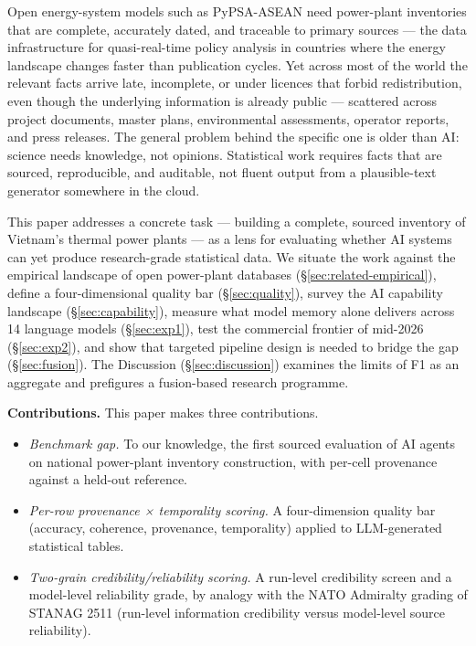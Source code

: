 \documentclass[a4paper,11pt]{article}
\providecommand{\tightlist}{%
  \setlength{\itemsep}{0pt}\setlength{\parskip}{0pt}}
\begin{document}
Open energy-system models such as PyPSA-ASEAN need power-plant
inventories that are complete, accurately dated, and traceable to
primary sources --- the data infrastructure for quasi-real-time policy
analysis in countries where the energy landscape changes faster than
publication cycles. Yet across most of the world the relevant facts
arrive late, incomplete, or under licences that forbid redistribution,
even though the underlying information is already public --- scattered
across project documents, master plans, environmental assessments,
operator reports, and press releases. The general problem behind the
specific one is older than AI: science needs knowledge, not opinions.
Statistical work requires facts that are sourced, reproducible, and
auditable, not fluent output from a plausible-text generator somewhere
in the cloud.

This paper addresses a concrete task --- building a complete, sourced
inventory of Vietnam's thermal power plants --- as a lens for evaluating
whether AI systems can yet produce research-grade statistical data. We
situate the work against the empirical landscape of open power-plant
databases (§\ref{sec:related-empirical}), define a four-dimensional
quality bar (§\ref{sec:quality}), survey the AI capability landscape
(§\ref{sec:capability}), measure what model memory alone delivers across
14 language models (§\ref{sec:exp1}), test the commercial frontier of
mid-2026 (§\ref{sec:exp2}), and show that targeted pipeline design is
needed to bridge the gap (§\ref{sec:fusion}). The Discussion
(§\ref{sec:discussion}) examines the limits of F1 as an aggregate and
prefigures a fusion-based research programme.

\textbf{Contributions.} This paper makes three contributions.

\begin{itemize}
\tightlist
\item
  \emph{Benchmark gap.} To our knowledge, the first sourced evaluation
  of AI agents on national power-plant inventory construction, with
  per-cell provenance against a held-out reference.
\item
  \emph{Per-row provenance × temporality scoring.} A four-dimension
  quality bar (accuracy, coherence, provenance, temporality) applied to
  LLM-generated statistical tables.
\item
  \emph{Two-grain credibility/reliability scoring.} A run-level
  credibility screen and a model-level reliability grade, by analogy
  with the NATO Admiralty grading of STANAG 2511 (run-level information
  credibility versus model-level source reliability).
\end{itemize}
\end{document}

